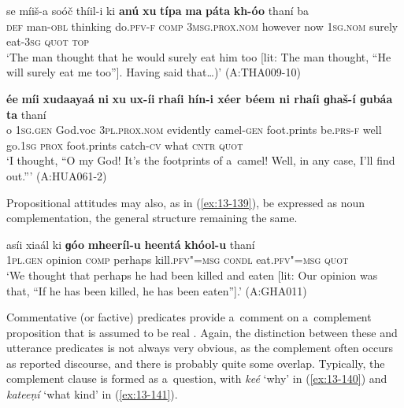\begin{exe}
\ex
\label{ex:13-137}
\gll se míiš-a soóč thíil-i ki \textbf{anú} \textbf{xu} \textbf{típa} \textbf{ma} \textbf{páta} \textbf{kh-óo} thaní ba\\
\textsc{def } man-\textsc{obl} thinking do.\textsc{pfv-f} \textsc{comp} \textsc{3msg.prox.nom} however now \textsc{1sg.nom} surely eat-\textsc{3sg} \textsc{quot} \textsc{top}\\
\glt `The man thought that he would surely eat him too [lit: The man thought, ``He will surely eat me too'']. Having said that{\ldots})' (A:THA009-10)

\ex
\label{ex:13-138}
\gll \textbf{ée} \textbf{míi} \textbf{xudaayaá} \textbf{ni} \textbf{xu} \textbf{ux-íi} \textbf{ rhaíi hín-i xéer béem ni rhaíi  ɡhaš-í ɡubáa ta} thaní\\
o \textsc{1sg.gen} God.voc \textsc{3pl.prox.nom} evidently camel-\textsc{gen}  foot.prints be.\textsc{prs-f} well go.\textsc{1sg} \textsc{prox} foot.prints catch-\textsc{cv} what \textsc{cntr} \textsc{quot } \\
\glt `I thought, ``O my God! It's the footprints of a~camel! Well, in any case, I'll find out.''' (A:HUA061-2) 
\end{exe}

Propositional attitudes may also, as in (\ref{ex:13-139}), be expressed as noun complementation, the general structure remaining the same.

\begin{exe}
\ex
\label{ex:13-139}
\gll asíi xiaál ki \textbf{ɡóo} \textbf{mheeríl-u} \textbf{heentá} \textbf{ khóol-u} thaní \\
\textsc{1pl}.\textsc{gen}  opinion \textsc{comp} perhaps kill.\textsc{pfv"=msg}  \textsc{condl} eat.\textsc{pfv"=msg} \textsc{quot} \\
\glt `We thought that perhaps he had been killed and eaten [lit: Our opinion was that, ``If he has been killed, he has been eaten''].' (A:GHA011) 
\end{exe}

 Commentative (or factive) predicates provide a~comment on a~complement proposition that is assumed to be real \citep[127--129]{noonan2007}. Again, the distinction between these and utterance predicates is not always very obvious, as the complement often occurs as reported discourse, and there is probably quite some overlap. Typically, the complement clause is formed as a~question, with \textit{keé} `why' in (\ref{ex:13-140}) and \textit{kateeṇí} `what kind' in (\ref{ex:13-141}).

